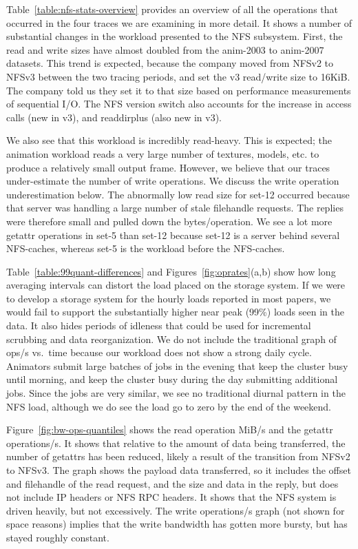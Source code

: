 Table~\ref{table:nfs-stats-overview} provides an overview of all the
operations that occurred in the four traces we are examining in more
detail.  It shows a number of substantial changes in the workload
presented to the NFS subsystem.  First, the read and write sizes have
almost doubled from the anim-2003 to anim-2007 datasets.  This trend is expected,
because the company moved from NFSv2 to NFSv3 between the two
tracing periods, and set the v3 read/write size to 16KiB.  The company told
us they set it to that size based on performance
measurements of sequential I/O.  The NFS version switch also accounts
for the increase in access calls (new in v3), and readdirplus (also
new in v3).  

We also see that this workload is incredibly read-heavy.  This is
expected; the animation workload reads a very large number of
textures, models, etc. to produce a relatively small output frame.
However, we believe that our traces under-estimate the number of write
operations.  We discuss the write operation underestimation below.
The abnormally low read size for set-12 occurred because
that server was handling a large number of stale filehandle requests.  The
replies were therefore small and pulled down the bytes/operation.  We
see a lot more getattr operations in set-5 than set-12 because set-12
is a server behind several NFS-caches, whereas set-5 is the workload
before the NFS-caches.



Table~\ref{table:99quant-differences} and
Figures~\ref{fig:oprates}(a,b) show how long averaging intervals can
distort the load placed on the storage system.  If we were to develop
a storage system for the hourly loads reported in most papers, we
would fail to support the substantially higher near peak (99\%) loads
seen in the data.  It also hides periods of idleness that could be
used for incremental scrubbing and data reorganization.  We do not
include the traditional graph of ops/s vs.\ time because our workload
does not show a strong daily cycle.  Animators submit large batches of
jobs in the evening that keep the cluster busy until morning, and
keep the cluster busy during the day submitting additional jobs.
Since the jobs are very similar, we see no traditional diurnal pattern
in the NFS load, although we do see the load go to zero by the end of
the weekend.

Figure~\ref{fig:bw-ops-quantiles} shows the read operation MiB/s and
the getattr operations/s.  It shows that relative to the amount of
data being transferred, the number of getattrs has been reduced,
likely a result of the transition from NFSv2 to NFSv3.  The graph
shows the payload data transferred, so it includes the offset and
filehandle of the read request, and the size and data in the reply,
but does not include IP headers or NFS RPC headers.  It shows that the
NFS system is driven heavily, but not excessively. The write operations/s graph
(not shown for space reasons) implies that the write bandwidth has
gotten more bursty, but has stayed roughly constant.

